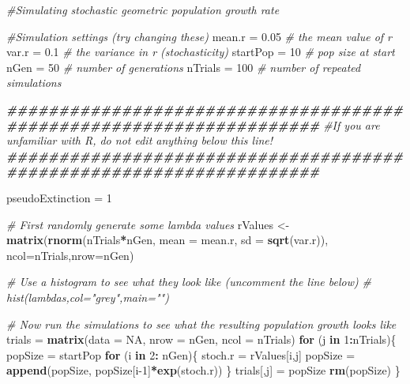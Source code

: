 \documentclass[
  a4paper]{book}
\newenvironment{Shaded}{\begin{snugshade}}{\end{snugshade}}
\newcommand{\AttributeTok}[1]{\textcolor[rgb]{0.13,0.29,0.53}{#1}}
\newcommand{\CommentTok}[1]{\textcolor[rgb]{0.56,0.35,0.01}{\textit{#1}}}
\newcommand{\ConstantTok}[1]{\textcolor[rgb]{0.56,0.35,0.01}{#1}}
\newcommand{\ControlFlowTok}[1]{\textcolor[rgb]{0.13,0.29,0.53}{\textbf{#1}}}
\newcommand{\DecValTok}[1]{\textcolor[rgb]{0.00,0.00,0.81}{#1}}
\newcommand{\DocumentationTok}[1]{\textcolor[rgb]{0.56,0.35,0.01}{\textbf{\textit{#1}}}}
\newcommand{\FloatTok}[1]{\textcolor[rgb]{0.00,0.00,0.81}{#1}}
\newcommand{\FunctionTok}[1]{\textcolor[rgb]{0.13,0.29,0.53}{\textbf{#1}}}
\newcommand{\NormalTok}[1]{#1}
\newcommand{\OtherTok}[1]{\textcolor[rgb]{0.56,0.35,0.01}{#1}}
\newcommand{\SpecialCharTok}[1]{\textcolor[rgb]{0.81,0.36,0.00}{\textbf{#1}}}
\begin{document}
\begin{Shaded}
\begin{Highlighting}[]
\CommentTok{\#Simulating stochastic geometric population growth rate}

\CommentTok{\#Simulation settings (try changing these)}
\NormalTok{mean.r }\OtherTok{=} \FloatTok{0.05} \CommentTok{\# the mean value of r}
\NormalTok{var.r }\OtherTok{=} \FloatTok{0.1} \CommentTok{\# the variance in r (stochasticity)}
\NormalTok{startPop }\OtherTok{=} \DecValTok{10} \CommentTok{\# pop size at start}
\NormalTok{nGen }\OtherTok{=} \DecValTok{50} \CommentTok{\# number of generations}
\NormalTok{nTrials }\OtherTok{=} \DecValTok{100} \CommentTok{\# number of repeated simulations}

\DocumentationTok{\#\#\#\#\#\#\#\#\#\#\#\#\#\#\#\#\#\#\#\#\#\#\#\#\#\#\#\#\#\#\#\#\#\#\#\#\#\#\#\#\#\#\#\#\#\#\#\#\#\#\#\#\#\#\#\#\#\#\#\#\#\#\#\#\#\#\#\#}
\CommentTok{\#If you are unfamiliar with R, do not edit anything below this line!}
\DocumentationTok{\#\#\#\#\#\#\#\#\#\#\#\#\#\#\#\#\#\#\#\#\#\#\#\#\#\#\#\#\#\#\#\#\#\#\#\#\#\#\#\#\#\#\#\#\#\#\#\#\#\#\#\#\#\#\#\#\#\#\#\#\#\#\#\#\#\#\#\#}

\NormalTok{pseudoExtinction }\OtherTok{=} \DecValTok{1}

\CommentTok{\# First randomly generate some lambda values}
\NormalTok{rValues }\OtherTok{\textless{}{-}} \FunctionTok{matrix}\NormalTok{(}\FunctionTok{rnorm}\NormalTok{(nTrials}\SpecialCharTok{*}\NormalTok{nGen, }\AttributeTok{mean =}\NormalTok{ mean.r, }\AttributeTok{sd =} \FunctionTok{sqrt}\NormalTok{(var.r)),}
                  \AttributeTok{ncol=}\NormalTok{nTrials,}\AttributeTok{nrow=}\NormalTok{nGen)}

\CommentTok{\# Use a histogram to see what they look like (uncomment the line below)}
\CommentTok{\# hist(lambdas,col="grey",main="")}

\CommentTok{\# Now run the simulations to see what the resulting population growth looks like}
\NormalTok{trials }\OtherTok{=} \FunctionTok{matrix}\NormalTok{(}\AttributeTok{data =} \ConstantTok{NA}\NormalTok{, }\AttributeTok{nrow =}\NormalTok{ nGen, }\AttributeTok{ncol =}\NormalTok{ nTrials)}
\ControlFlowTok{for}\NormalTok{ (j }\ControlFlowTok{in} \DecValTok{1}\SpecialCharTok{:}\NormalTok{nTrials)\{}
\NormalTok{  popSize }\OtherTok{=}\NormalTok{ startPop  }
  \ControlFlowTok{for}\NormalTok{ (i }\ControlFlowTok{in} \DecValTok{2}\SpecialCharTok{:}\NormalTok{ nGen)\{}
\NormalTok{  stoch.r }\OtherTok{=}\NormalTok{ rValues[i,j]}
\NormalTok{  popSize }\OtherTok{=} \FunctionTok{append}\NormalTok{(popSize, popSize[i}\DecValTok{{-}1}\NormalTok{]}\SpecialCharTok{*}\FunctionTok{exp}\NormalTok{(stoch.r))}
\NormalTok{\}}
\NormalTok{trials[,j] }\OtherTok{=}\NormalTok{ popSize}
\FunctionTok{rm}\NormalTok{(popSize)}
\NormalTok{\}}


\end{Highlighting}
\end{Shaded}
\end{document}
